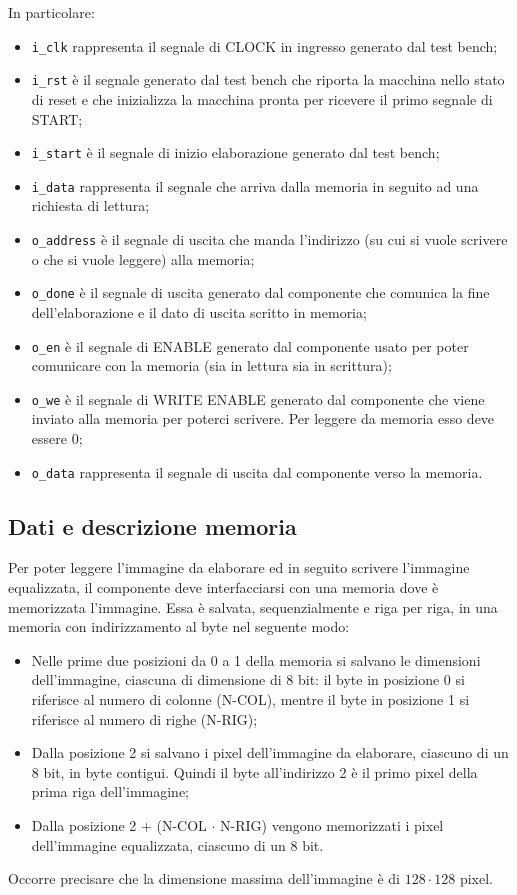 \documentclass{article}
\begin{document}
\noindent In particolare:\\
\begin{itemize}
	\item \verb^i_clk^ rappresenta il segnale di CLOCK in ingresso generato dal test bench;
	\item \verb^i_rst^ è il segnale generato dal test bench che riporta la macchina nello stato di reset e che inizializza la macchina pronta per ricevere il primo segnale di START;
	\item \verb^i_start^ è il segnale di inizio elaborazione generato dal test bench;
	\item \verb^i_data^ rappresenta il segnale che arriva dalla memoria in seguito ad una richiesta di lettura;
	\item \verb^o_address^ è il segnale di uscita che manda l’indirizzo (su cui si vuole scrivere o che si vuole leggere) alla memoria;
	\item \verb^o_done^ è il segnale di uscita generato dal componente che comunica la fine dell’elaborazione e il dato di uscita scritto in memoria;
	\item \verb^o_en^ è il segnale di ENABLE generato dal componente usato per poter comunicare con la memoria (sia in lettura sia in scrittura);
	\item \verb^o_we^ è il segnale di WRITE ENABLE generato dal componente che viene inviato alla memoria per poterci scrivere. Per leggere da memoria esso deve essere 0;
	\item \verb^o_data^ rappresenta il segnale di uscita dal componente verso la memoria.
\end{itemize}

\subsection{Dati e descrizione memoria}
Per poter leggere l'immagine da elaborare ed in seguito scrivere l'immagine equalizzata, il componente deve interfacciarsi con una memoria dove è memorizzata l'immagine. Essa è salvata, sequenzialmente e riga per riga, in una memoria con indirizzamento al byte nel seguente modo: \\
\begin{itemize}
	\item Nelle prime due posizioni da 0 a 1 della memoria si salvano le dimensioni dell'immagine, ciascuna di dimensione di 8 bit: il byte in posizione 0 si riferisce al numero di colonne (N-COL), mentre il byte in posizione 1 si riferisce al numero di righe (N-RIG);
	\item Dalla posizione 2 si salvano i pixel dell'immagine da elaborare, ciascuno di un 8 bit, in byte contigui. Quindi il byte
all’indirizzo 2 è il primo pixel della prima riga dell’immagine;
	\item Dalla posizione 2 + (N-COL $\cdot$ N-RIG) vengono memorizzati i pixel dell'immagine equalizzata, ciascuno di un 8 bit.
\end{itemize}
Occorre precisare che la dimensione massima dell'immagine è di $128\cdot128$ pixel.
\end{document}
